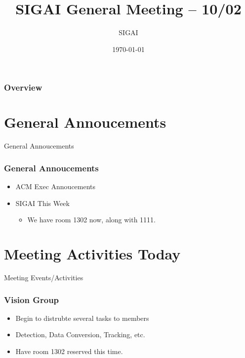 \documentclass{beamer}
\title[10/02]{SIGAI General Meeting -- 10/02} %
\author{SIGAI} %
\institute[http://sigai.ml] %
{
  \textit{http://sigai.ml} %
}
\date{\today} %
\begin{document}
\begin{frame}
  \titlepage %
\end{frame}

\begin{frame}
  \frametitle{Overview} %
  \tableofcontents %
\end{frame}

\section{General Annoucements}
\begin{frame}
  \huge{\centerline{General Annoucements}}
\end{frame}
\begin{frame}
  \frametitle{General Annoucements}
  \begin{itemize}
  \item ACM Exec Annoucements
  \item SIGAI This Week
    \begin{itemize}
    \item We have room 1302 now, along with 1111.
    \end{itemize}
  \end{itemize}
\end{frame}

\section{Meeting Activities Today}
\begin{frame}
  \huge{\centerline{Meeting Events/Activities}}
\end{frame}
\begin{frame}
  \frametitle{Vision Group}
  \begin{itemize}
  \item Begin to distrubte several tasks to members
  \item Detection, Data Conversion, Tracking, etc.
  \item Have room 1302 reserved this time.
  \end{itemize}
\end{frame}
\end{document}
